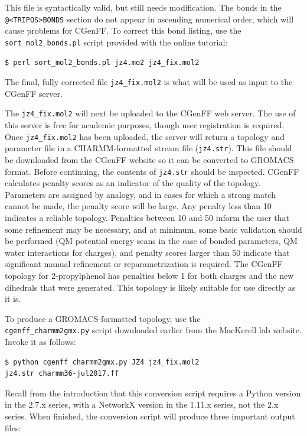 \documentclass[9pt,tutorial]{livecoms}
\begin{document}
This file is syntactically valid, but still needs modification. The bonds in the \texttt{@<TRIPOS>BONDS} section do not appear in ascending numerical order, which will cause problems for CGenFF. To correct this bond listing, use the \texttt{sort\_mol2\_bonds.pl} script provided with the online tutorial:

\begin{verbatim}
$ perl sort_mol2_bonds.pl jz4.mo2 jz4_fix.mol2
\end{verbatim}

The final, fully corrected file \texttt{jz4\_fix.mol2} is what will be used as input to the CGenFF server.

The \texttt{jz4\_fix.mol2} will next be uploaded to the CGenFF web server. The use of this server is free for academic purposes, though user registration is required. Once \texttt{jz4\_fix.mol2} has been uploaded, the server will return a topology and parameter file in a CHARMM-formatted stream file (\texttt{jz4.str}). This file should be downloaded from the CGenFF website so it can be converted to GROMACS format. Before continuing, the contents of \texttt{jz4.str} should be inspected. CGenFF calculates penalty scores as an indicator of the quality of the topology. Parameters are assigned by analogy, and in cases for which a strong match cannot be made, the penalty score will be large. Any penalty less than 10 indicates a reliable topology. Penalties between 10 and 50 inform the user that some refinement may be necessary, and at minimum, some basic validation should be performed (QM potential energy scans in the case of bonded parameters, QM water interactions for charges), and penalty scores larger than 50 indicate that significant manual refinement or reparametrization is required. The CGenFF topology for 2-propylphenol has penalties below 1 for both charges and the new dihedrals that were generated. This topology is likely suitable for use directly as it is.

To produce a GROMACS-formatted topology, use the \\\texttt{cgenff\_charmm2gmx.py} script downloaded earlier from the MacKerell lab website. Invoke it as follows:

\begin{verbatim}
$ python cgenff_charmm2gmx.py JZ4 jz4_fix.mol2 
jz4.str charmm36-jul2017.ff
\end{verbatim}

Recall from the introduction that this conversion script requires a Python version in the 2.7.x series, with a NetworkX version in the 1.11.x series, not the 2.x series. When finished, the conversion script will produce three important output files:
\end{document}
